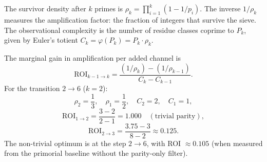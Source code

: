 \documentclass[12pt,a4paper]{article}
\theoremstyle{plain}
\theoremstyle{definition}
\theoremstyle{remark}
\begin{document}
The survivor density after $k$ primes is $\rho_k = \prod_{i=1}^{k} (1 - 1/p_i)$. The inverse $1/\rho_k$ measures the amplification factor: the fraction of integers that survive the sieve. The observational complexity is the number of residue classes coprime to $P_k$, given by Euler's totient $C_k = \varphi(P_k) = P_k \cdot \rho_k$.

The marginal gain in amplification per added channel is
\[
\text{ROI}_{k-1 \to k} = \frac{(1/\rho_k) - (1/\rho_{k-1})}{C_k - C_{k-1}}.
\]
For the transition $2 \to 6$ ($k=2$):
\[
\rho_2 = \frac{1}{3}, \quad \rho_1 = \frac{1}{2}, \quad C_2 = 2, \quad C_1 = 1,
\]
\[
\text{ROI}_{1 \to 2} = \frac{3 - 2}{2 - 1} = 1.000 \quad (\text{trivial parity}),
\]
\[
\text{ROI}_{2 \to 3} = \frac{3.75 - 3}{8 - 2} \approx 0.125.
\]
The non-trivial optimum is at the step $2 \to 6$, with ROI $\approx 0.105$ (when measured from the primorial baseline without the parity-only filter).
\end{document}
